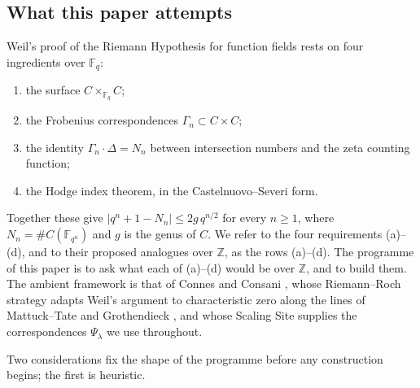 \documentclass[11pt]{amsart}
\theoremstyle{definition}
\theoremstyle{remark}
\newcommand{\Z}{\mathbb Z}
\begin{document}
\subsection{What this paper attempts}

Weil's proof of the Riemann Hypothesis for function fields
\cite{Weil1948,Weil1952} rests on four ingredients over $\mathbb F_q$:

\begin{enumerate}
\item[(a)] the surface $C\times_{\mathbb F_q}C$;
\item[(b)] the Frobenius correspondences $\Gamma_n\subset C\times C$;
\item[(c)] the identity $\Gamma_n\cdot\Delta=N_n$ between intersection
numbers and the zeta counting function;
\item[(d)] the Hodge index theorem, in the Castelnuovo--Severi form.
\end{enumerate}

Together these give $|q^n+1-N_n|\le 2g\,q^{n/2}$ for every $n\ge1$, where
$N_n=\#C(\mathbb F_{q^n})$ and $g$ is the genus of $C$.  We refer to the four
requirements (a)--(d), and to their proposed analogues over $\Z$, as the
rows (a)--(d).  The programme of this paper is to
ask what each of (a)--(d) would be over $\Z$, and to build them.  The
ambient framework is that of Connes and Consani
\cite{CC-ArithmeticSite,CC-ScalingSite,CC-RRstrategy,CC-RRSpecZ}, whose
Riemann--Roch strategy adapts Weil's argument to characteristic zero along
the lines of Mattuck--Tate and Grothendieck
\cite{MattuckTate,Grothendieck}, and whose Scaling Site supplies the
correspondences $\Psi_\lambda$ we use throughout.

Two considerations fix the shape of the programme before any construction
begins; the first is heuristic.
\end{document}
